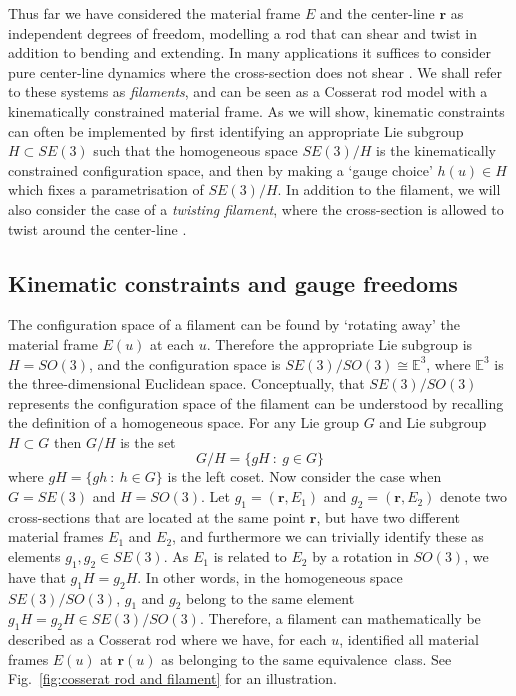 Thus far we have considered the material frame $E$ and the center-line $\mathbf{r}$ as independent degrees of freedom, modelling a rod that can shear and twist in addition to bending and extending. In many applications it suffices to consider pure center-line dynamics where the cross-section does not shear \citep{eloyKinematicsMostEfficient2012, tornbergSimulatingDynamicsInteractions2004, goldsteinNonlinearDynamicsStiff1995, sodaDynamicsStiffChains1973, nordgrenComputationMotionElastic1974, hasimotoSolitonVortexFilament1972}. We shall refer to these systems as \textit{filaments}, and can be seen as a Cosserat rod model with a kinematically constrained material frame. As we will show, kinematic constraints can often be implemented by first identifying an appropriate Lie subgroup $H \subset SE(3)$ such that the homogeneous space $SE(3) / H$ is the kinematically constrained configuration space, and then by making a `gauge choice' $h(u) \in H$ which fixes a parametrisation of $SE(3) / H$. In addition to the filament, we will also consider the case of a \textit{twisting filament}, where the cross-section is allowed to twist around the center-line \citep{powersDynamicsFilamentsMembranes2010, parkerDerivationNonlinearRod1984a, goldsteinViscousNonlinearDynamics1998}.

\subsection{Kinematic constraints and gauge freedoms} \label{sec:Kinematic constraints and gauge freedoms}

The configuration space of a filament can be found by `rotating away' the material frame $E(u)$ at each $u$. Therefore the appropriate Lie subgroup is $H = SO(3)$, and the configuration space is $SE(3) / SO(3) \cong \mathbb{E}^3$, where $\mathbb{E}^3$ is the three-dimensional Euclidean space. Conceptually, that $SE(3)/SO(3)$ represents the configuration space of the filament can be understood by recalling the definition of a homogeneous space. For any Lie group $G$ and Lie subgroup $H \subset G$ then $G/H$ is the set
\begin{equation}
G / H = \{ gH\ :\ g \in G \}
\end{equation}
where $gH = \{ gh\ :\ h \in G \}$ is the left coset. Now consider the case when $G = SE(3)$ and $H = SO(3)$. Let $g_1 = (\mathbf{r}, E_1)$ and $g_2 = (\mathbf{r}, E_2)$ denote two cross-sections that are located at the same point $\mathbf{r}$, but have two different material frames $E_1$ and $E_2$, and furthermore we can trivially identify these as elements $g_1, g_2 \in SE(3)$. As $E_1$ is related to $E_2$ by a rotation in $SO(3)$, we have that $g_1 H = g_2 H$. In other words, in the homogeneous space $SE(3)/SO(3)$, $g_1$ and $g_2$ belong to the same element $g_1 H = g_2 H \in SE(3)/SO(3)$. Therefore, a filament can mathematically be described as a Cosserat rod where we have, for each $u$, identified all material frames $E(u)$ at $\mathbf{r}(u)$ as belonging to the same equivalence~class. See Fig.~\ref{fig:cosserat rod and filament} for an illustration.

